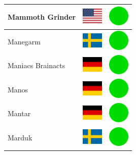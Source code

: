 \documentclass[12pt, a4paper, twoside]{report}
\begin{document}
\begin{center}
\begin{longtable}{|p{5cm}|p{2cm}|p{2cm}|}
 Mammoth Grinder                                            & \includegraphics[width=1cm]{../img/flags/us} &   \includegraphics[width=1cm]{../likes/y} \\ \hline
 Manegarm                                                   & \includegraphics[width=1cm]{../img/flags/se} &   \includegraphics[width=1cm]{../likes/y} \\ \hline
 Maniacs Brainacts                                          & \includegraphics[width=1cm]{../img/flags/de} &   \includegraphics[width=1cm]{../likes/y} \\ \hline
 Manos                                                      & \includegraphics[width=1cm]{../img/flags/de} &   \includegraphics[width=1cm]{../likes/y} \\ \hline
 Mantar                                                     & \includegraphics[width=1cm]{../img/flags/de} &   \includegraphics[width=1cm]{../likes/y} \\ \hline
 Marduk                                                     & \includegraphics[width=1cm]{../img/flags/se} &   \includegraphics[width=1cm]{../likes/y} \\ \hline

\end{longtable}
\end{center}
\end{document}
